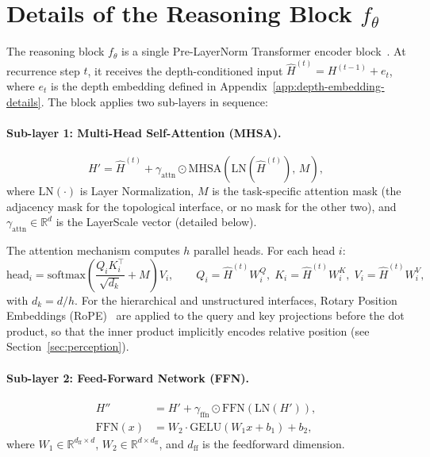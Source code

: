 \section{Details of the Reasoning Block \texorpdfstring{$f_\theta$}{f-theta}} \label{app:f-theta-details}

The reasoning block $f_\theta$ is a single Pre-LayerNorm Transformer encoder block~\citep{xiong2020layer}. At recurrence step $t$, it receives the depth-conditioned input $\hat{H}^{(t)} = H^{(t-1)} + e_t$, where $e_t$ is the depth embedding defined in Appendix~\ref{app:depth-embedding-details}. The block applies two sub-layers in sequence:

\paragraph{Sub-layer 1: Multi-Head Self-Attention (MHSA).}
\begin{equation}
    H' = \hat{H}^{(t)} + \gamma_{\mathrm{attn}} \odot
         \mathrm{MHSA}\!\left(\mathrm{LN}\!\left(\hat{H}^{(t)}\right),\, M\right),
\end{equation}
where $\mathrm{LN}(\cdot)$ is Layer Normalization, $M$ is the task-specific attention mask (the adjacency mask for the topological interface, or no mask for the other two), and $\gamma_{\mathrm{attn}} \in \mathbb{R}^d$ is the LayerScale vector (detailed below).

The attention mechanism computes $h$ parallel heads. For each head $i$:
\begin{equation}
    \mathrm{head}_i = \mathrm{softmax}\!\left(
        \frac{Q_i K_i^\top}{\sqrt{d_k}} + M
    \right) V_i, \qquad
    Q_i = \hat{H}^{(t)} W_i^Q,\;
    K_i = \hat{H}^{(t)} W_i^K,\;
    V_i = \hat{H}^{(t)} W_i^V,
\end{equation}
with $d_k = d / h$. For the hierarchical and unstructured interfaces, Rotary Position Embeddings (RoPE)~\citep{su2024roformer} are applied to the query and key projections before the dot product, so that the inner product implicitly encodes relative position (see Section~\ref{sec:perception}).

\paragraph{Sub-layer 2: Feed-Forward Network (FFN).}
\begin{align}
    H'' &= H' + \gamma_{\mathrm{ffn}} \odot \mathrm{FFN}\!\left(\mathrm{LN}(H')\right), \\
    \mathrm{FFN}(x) &= W_2 \cdot \mathrm{GELU}(W_1 x + b_1) + b_2,
\end{align}
where $W_1 \in \mathbb{R}^{d_{\mathrm{ff}} \times d}$, $W_2 \in \mathbb{R}^{d \times d_{\mathrm{ff}}}$, and $d_{\mathrm{ff}}$ is the feedforward dimension.

